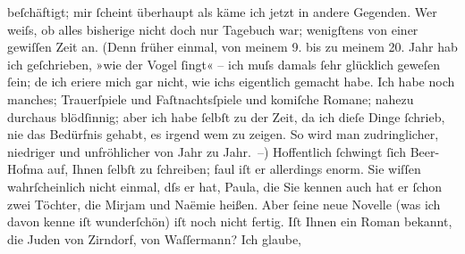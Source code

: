 \begin{ledgroupsized}[t]{13cm}
               beſchäftigt; mir ſcheint überhaupt als käme ich jetzt in andere Gegenden. Wer weiſs,
               ob alles bisherige nicht doch nur Tagebuch war; wenigſtens von einer gewiſſen Zeit
               an. (Denn früher einmal, von meinem 9. bis zu meinem 20. Jahr hab ich geſchrieben,
               »wie der Vogel ſingt« – ich muſs damals ſehr glücklich geweſen ſein; de{\geminationn} ich eri{\geminationn}ere mich gar
               nicht, wie ichs eigentlich gemacht habe. Ich habe noch manches; Trauerſpiele und
               Faſtnachtsſpiele und {\pb}komiſche Romane; nahezu
               durchaus blödſinnig; aber ich habe ſelbſt zu der Zeit, da ich dieſe Dinge ſchrieb,
               nie das Bedürfnis gehabt, es irgend wem zu zeigen. So wird man zudringlicher,
               niedriger und unfröhlicher von Jahr zu Jahr. –)\pend
           \pstart
           Hoffentlich ſchwingt ſich Beer-Hofma{\geminationn} auf, Ihnen ſelbſt zu ſchreiben; faul iſt er allerdings enorm. Sie wiſſen
               wahrſcheinlich nicht einmal, dſs er \label{K_L00880-3v}\label{K_L00880-3h} hat, Paula, die Sie kennen {\pb}auch hat er ſchon
               zwei Töchter, die Mirjam und Naëmie heißen. Aber ſeine neue Novelle (was ich davon kenne iſt wunderſchön) iſt noch
               nicht fertig.\pend
           \pstart
           Iſt Ihnen ein Roman bekannt, die Juden von
                  Zirndorf, von Waſſermann? Ich glaube,

\end{ledgroupsized}
